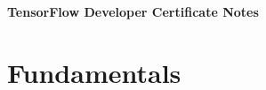 \documentclass[11pt, a4paper]{article}
\begin{document}
	\begin{titlepage}
		\begin{center} \Huge \textbf{TensorFlow Developer Certificate Notes} \end{center}
		\tableofcontents
		\newpage
	\end{titlepage}
	
	
	\section{Fundamentals}
	
	
	
	
\end{document}
